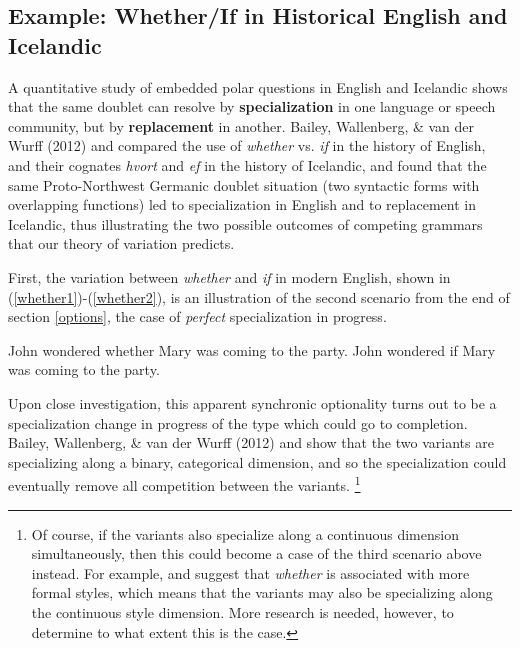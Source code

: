 \subsection{Example: Whether/If in Historical English and Icelandic}
\label{whetherifsect}

A quantitative study of embedded polar questions in English and Icelandic shows that the same doublet can resolve by \textbf{specialization} in one language or speech community, but by \textbf{replacement} in another. Bailey, Wallenberg, \& van der Wurff (2012) and  compared the use of \textsl{whether} vs. \textsl{if} in the history of English, and their cognates \textsl{hvort} and \textsl{ef} in the history of Icelandic, and found that the same Proto-Northwest Germanic doublet situation (two syntactic forms with overlapping functions) led to specialization in English and to replacement in Icelandic, thus illustrating the two possible outcomes of competing grammars that our theory of variation predicts.

First, the variation between \textsl{whether} and \textsl{if} in modern English, shown in (\ref{whether1})-(\ref{whether2}), is an illustration of the second scenario from the end of section \ref{options}, the case of \textsl{perfect} specialization in progress.

\begin{exe}
		\ex \label{whether1} John wondered whether Mary was coming to the party.
		\ex \label{whether2} John wondered if Mary was coming to the party.
	\end{exe}
	
\noindent Upon close investigation, this apparent synchronic optionality turns out to be a specialization change in progress of the type which could go to completion.
Bailey, Wallenberg, \& van der Wurff (2012) and  show that the two variants are specializing along a binary, categorical dimension, and so the specialization could eventually remove all competition between the variants.
\footnote{Of course, if the variants also specialize along a continuous dimension simultaneously, then this could become a case of the third scenario above instead.
For example, \citet[][690--3]{biberetal1999} and \citet[][973--5]{huddlestonpullum2002} suggest that \textsl{whether} is associated with more formal styles, which means that the variants may also be specializing along the continuous style dimension.
More research is needed, however, to determine to what extent this is the case.}

